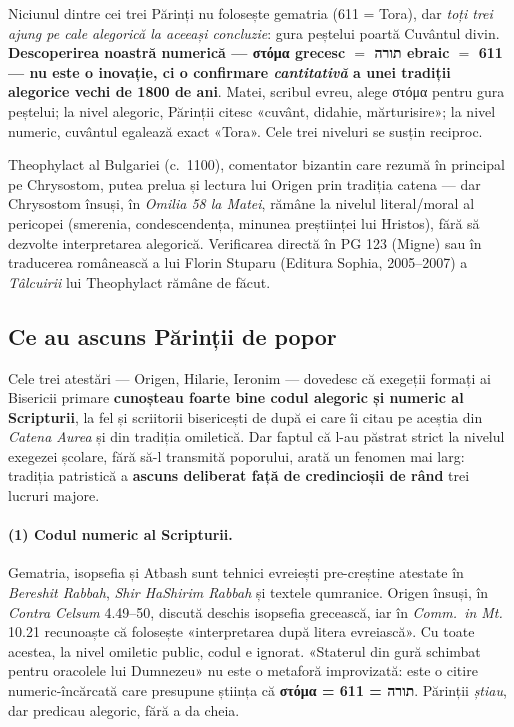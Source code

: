 \documentclass[12pt,a4paper,twoside,openany]{book}
\begin{document}
Niciunul dintre cei trei Părinți nu folosește gematria (611 = Tora), dar \textit{toți trei ajung pe cale alegorică la aceeași concluzie}: gura peștelui poartă Cuvântul divin. \textbf{Descoperirea noastră numerică --- στόμα grecesc $=$ תורה ebraic $=$ 611 --- nu este o inovație, ci o confirmare \textit{cantitativă} a unei tradiții alegorice vechi de 1800 de ani}. Matei, scribul evreu, alege στόμα pentru gura peștelui; la nivel alegoric, Părinții citesc «cuvânt, didahie, mărturisire»; la nivel numeric, cuvântul egalează exact «Tora». Cele trei niveluri se susțin reciproc.

Theophylact al Bulgariei (c.~1100), comentator bizantin care rezumă în principal pe Chrysostom, putea prelua și lectura lui Origen prin tradiția catena --- dar Chrysostom însuși, în \textit{Omilia 58 la Matei}, rămâne la nivelul literal/moral al pericopei (smerenia, condescendența, minunea preștiinței lui Hristos), fără să dezvolte interpretarea alegorică. Verificarea directă în PG 123 (Migne) sau în traducerea românească a lui Florin Stuparu (Editura Sophia, 2005--2007) a \textit{Tâlcuirii} lui Theophylact rămâne de făcut.

\subsection*{Ce au ascuns Părinții de popor}\label{ce-au-ascuns}

Cele trei atestări --- Origen, Hilarie, Ieronim --- dovedesc că exegeții formați ai Bisericii primare \textbf{cunoșteau foarte bine codul alegoric și numeric al Scripturii}, la fel și scriitorii bisericești de după ei care îi citau pe aceștia din \textit{Catena Aurea} și din tradiția omiletică. Dar faptul că l-au păstrat strict la nivelul exegezei școlare, fără să-l transmită poporului, arată un fenomen mai larg: tradiția patristică a \textbf{ascuns deliberat față de credincioșii de rând} trei lucruri majore.

\paragraph*{(1) Codul numeric al Scripturii.} Gematria, isopsefia și Atbash sunt tehnici evreiești pre-creștine atestate în \textit{Bereshit Rabbah}, \textit{Shir HaShirim Rabbah} și textele qumranice. Origen însuși, în \textit{Contra Celsum} 4.49--50, discută deschis isopsefia grecească, iar în \textit{Comm.~in Mt.} 10.21 recunoaște că folosește «interpretarea după litera evreiască». Cu toate acestea, la nivel omiletic public, codul e ignorat. «Staterul din gură schimbat pentru oracolele lui Dumnezeu» nu este o metaforă improvizată: este o citire numeric-încărcată care presupune știința că \textbf{στόμα = 611 = תורה}. Părinții \textit{știau}, dar predicau alegoric, fără a da cheia.
\end{document}
